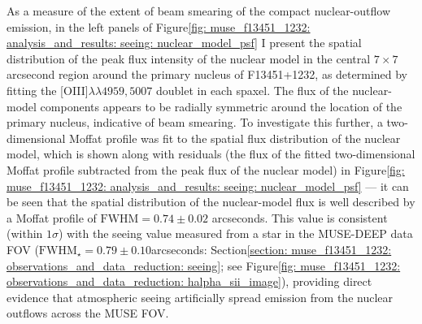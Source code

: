 As a measure of the extent of beam smearing of the compact nuclear-outflow emission, in the left panels of Figure\;\ref{fig: muse_f13451_1232: analysis_and_results: seeing: nuclear_model_psf} I present the spatial distribution of the peak flux intensity of the nuclear model in the central $7\times7$\;arcsecond region around the primary nucleus of F13451+1232, as determined by fitting the [OIII]$\lambda\lambda4959,5007$ doublet in each spaxel. The flux of the nuclear-model components appears to be radially symmetric around the location of the primary nucleus, indicative of beam smearing. To investigate this further, a two-dimensional Moffat profile was fit to the spatial flux distribution of the nuclear model, which is shown along with residuals (the flux of the fitted two-dimensional Moffat profile subtracted from the peak flux of the nuclear model) in Figure\;\ref{fig: muse_f13451_1232: analysis_and_results: seeing: nuclear_model_psf} --- it can be seen that the spatial distribution of the nuclear-model flux is well described by a Moffat profile of $\mathrm{FWHM}=0.74\pm0.02$ arcseconds. This value is consistent (within $1\sigma$) with the seeing value measured from a star in the MUSE-DEEP data FOV ($\mathrm{FWHM}_\star=0.79\pm0.10$\;arcseconds: Section\;\ref{section: muse_f13451_1232: observations_and_data_reduction: seeing}; see Figure\;\ref{fig: muse_f13451_1232: observations_and_data_reduction: halpha_sii_image}), providing direct evidence that atmospheric seeing artificially spread emission from the nuclear outflows across the MUSE FOV.

